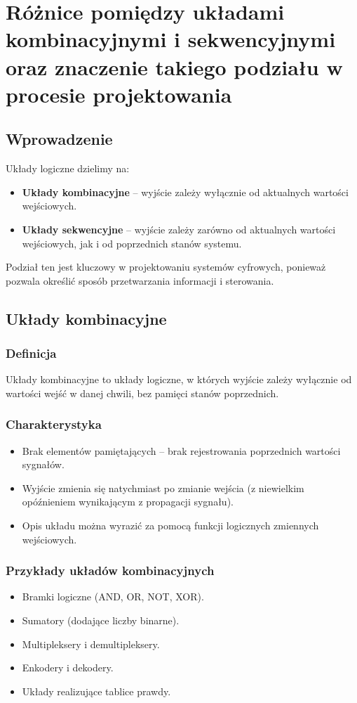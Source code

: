 \section{Różnice pomiędzy układami kombinacyjnymi i sekwencyjnymi oraz znaczenie takiego podziału w procesie projektowania}

\subsection{Wprowadzenie}
Układy logiczne dzielimy na:
\begin{itemize}
    \item \textbf{Układy kombinacyjne} – wyjście zależy wyłącznie od aktualnych wartości wejściowych.
    \item \textbf{Układy sekwencyjne} – wyjście zależy zarówno od aktualnych wartości wejściowych, jak i od poprzednich stanów systemu.
\end{itemize}

Podział ten jest kluczowy w projektowaniu systemów cyfrowych, ponieważ pozwala określić sposób przetwarzania informacji i sterowania.

\subsection{Układy kombinacyjne}
\subsubsection{Definicja}
Układy kombinacyjne to układy logiczne, w których wyjście zależy wyłącznie od wartości wejść w danej chwili, bez pamięci stanów poprzednich.

\subsubsection{Charakterystyka}
\begin{itemize}
    \item Brak elementów pamiętających – brak rejestrowania poprzednich wartości sygnałów.
    \item Wyjście zmienia się natychmiast po zmianie wejścia (z niewielkim opóźnieniem wynikającym z propagacji sygnału).
    \item Opis układu można wyrazić za pomocą funkcji logicznych zmiennych wejściowych.
\end{itemize}

\subsubsection{Przykłady układów kombinacyjnych}
\begin{itemize}
    \item Bramki logiczne (AND, OR, NOT, XOR).
    \item Sumatory (dodające liczby binarne).
    \item Multipleksery i demultipleksery.
    \item Enkodery i dekodery.
    \item Układy realizujące tablice prawdy.
\end{itemize}

